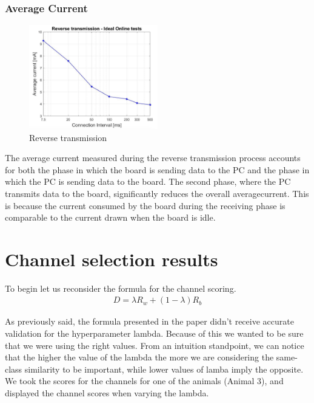 \documentclass{Configuration_Files/PoliMi3i_thesis}
\begin{document}
\subsubsection*{Average Current}

\begin{figure}[H]
    \centering
    \includegraphics[width=0.5\textwidth]{Results Manuel/figure40}
    \caption{Reverse transmission}
    \label{manuel_results_40}
\end{figure}

The average current measured during the reverse transmission process accounts for both the phase in which the board is sending data to the PC and the phase in which the PC is sending data to the board. The second phase, where the PC transmits data to the board, significantly reduces the overall averagecurrent. This is because the current consumed by the board during the receiving phase is comparable to the current drawn when the board is idle.

\section{Channel selection results}

To begin let us reconsider the formula for the channel scoring.
\begin{align}
	D = \lambda R_w + (1-\lambda)R_b
   \label{eq:XCDC6_3}
\end{align}

As previously said, the formula presented in the paper \cite{yuCrossCorrelationBasedDiscriminant2021}
didn't receive accurate validation for the hyperparameter lambda.
Because of this we wanted to be sure that we were using the right values.
From an intuition standpoint, we can notice that the higher the value of the lambda the more we are considering the same-class similarity to be important, while lower values of lamba imply the opposite.
We took the scores for the channels for one of the animals (Animal 3), and displayed the channel scores when varying the lambda.
\end{document}
